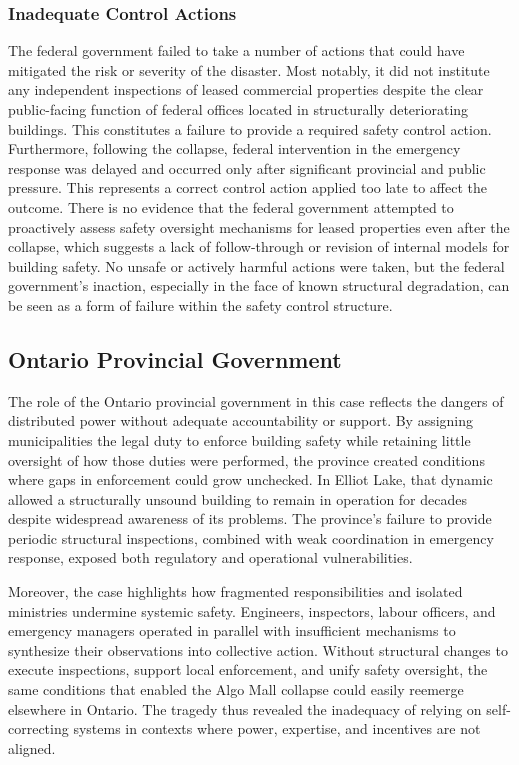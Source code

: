 \documentclass[12pt]{article}
\begin{document}
\subsubsection*{Inadequate Control Actions}

The federal government failed to take a number of actions that could have mitigated the risk or severity of the disaster. Most notably, it did not institute any independent inspections of leased commercial properties despite the clear public-facing function of federal offices located in structurally deteriorating buildings. This constitutes a failure to provide a required safety control action. Furthermore, following the collapse, federal intervention in the emergency response was delayed and occurred only after significant provincial and public pressure. This represents a correct control action applied too late to affect the outcome. There is no evidence that the federal government attempted to proactively assess safety oversight mechanisms for leased properties even after the collapse, which suggests a lack of follow-through or revision of internal models for building safety. No unsafe or actively harmful actions were taken, but the federal government's inaction, especially in the face of known structural degradation, can be seen as a form of failure within the safety control structure.

\subsection{Ontario Provincial Government}

The role of the Ontario provincial government in this case reflects the dangers of distributed power without adequate accountability or support. By assigning municipalities the legal duty to enforce building safety while retaining little oversight of how those duties were performed, the province created conditions where gaps in enforcement could grow unchecked. In Elliot Lake, that dynamic allowed a structurally unsound building to remain in operation for decades despite widespread awareness of its problems. The province's failure to provide periodic structural inspections, combined with weak coordination in emergency response, exposed both regulatory and operational vulnerabilities.

Moreover, the case highlights how fragmented responsibilities and isolated ministries undermine systemic safety. Engineers, inspectors, labour officers, and emergency managers operated in parallel with insufficient mechanisms to synthesize their observations into collective action. Without structural changes to execute inspections, support local enforcement, and unify safety oversight, the same conditions that enabled the Algo Mall collapse could easily reemerge elsewhere in Ontario. The tragedy thus revealed the inadequacy of relying on self-correcting systems in contexts where power, expertise, and incentives are not aligned.
\end{document}
